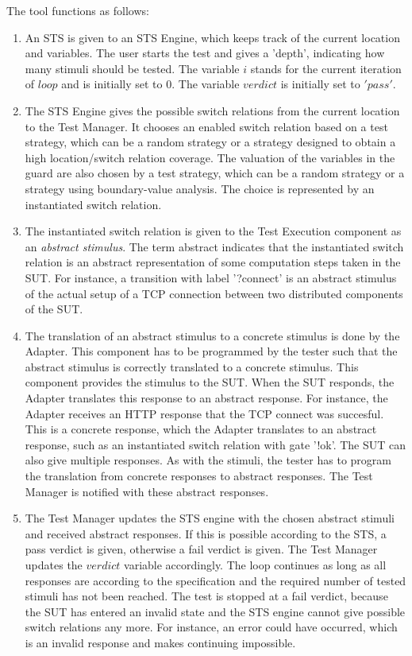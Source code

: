 The tool functions as follows: 
\begin{enumerate}
  \item An STS is given to an STS Engine, which keeps track of the current location and variables. The user starts the test and gives a 'depth', indicating how many stimuli should be tested. The variable $i$ stands for the current iteration of $loop$ and is initially set to $0$. The variable $verdict$ is initially set to $'pass'$.
  \item The STS Engine gives the possible switch relations from the current location to the Test Manager. It chooses an enabled switch relation based on a test strategy, which can be a random strategy or a strategy designed to obtain a high location/switch relation coverage. The valuation of the variables in the guard are also chosen by a test strategy, which can be a random strategy or a strategy using boundary-value analysis. The choice is represented by an instantiated switch relation.
  \item The instantiated switch relation is given to the Test Execution component as an \textit{abstract stimulus}. The term abstract indicates that the instantiated switch relation is an abstract representation of some computation steps taken in the SUT. For instance, a transition with label '?connect' is an abstract stimulus of the actual setup of a TCP connection between two distributed components of the SUT. 
  \item The translation of an abstract stimulus to a concrete stimulus is done by the Adapter. This component has to be programmed by the tester such that the abstract stimulus is correctly translated to a concrete stimulus. This component provides the stimulus to the SUT. When the SUT responds, the Adapter translates this response to an abstract response. For instance, the Adapter receives an HTTP response that the TCP connect was succesful. This is a concrete response, which the Adapter translates to an abstract response, such as an instantiated switch relation with gate '!ok'. The SUT can also give multiple responses. As with the stimuli, the tester has to program the translation from concrete responses to abstract responses. The Test Manager is notified with these abstract responses.
  \item The Test Manager updates the STS engine with the chosen abstract stimuli and received abstract responses. If this is possible according to the STS, a pass verdict is given, otherwise a fail verdict is given. The Test Manager updates the $verdict$ variable accordingly. The loop continues as long as all responses are according to the specification and the required number of tested stimuli has not been reached. The test is stopped at a fail verdict, because the SUT has entered an invalid state and the STS engine cannot give possible switch relations any more. For instance, an error could have occurred, which is an invalid response and makes continuing impossible.

\end{enumerate}
